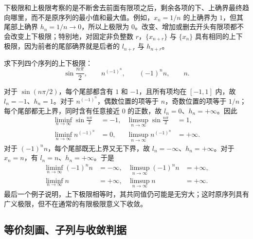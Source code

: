 \begin{notealert}[title={上下极限描述尾部的边界}]
下极限和上极限考察的是不断舍去前面有限项之后，剩余各项的下、上确界最终趋向哪里，而不是原序列的最小值和最大值。例如，$x_n=1/n$ 的上确界为 $1$，但其尾部上确界 $h_n=1/n\to0$，所以上极限为 $0$。改变、增加或删去开头有限项都不会改变上下极限；特别地，对固定非负整数 $r$，$\{x_{n+r}\}$ 与 $\{x_n\}$ 具有相同的上下极限，因为前者的尾部确界就是后者的 $l_{n+r}$ 与 $h_{n+r}$。
\end{notealert}

\begin{example}
求下列四个序列的上下极限：
\[
    \sin\frac{n\pi}{2},\qquad n^{(-1)^n},\qquad (-1)^n n,\qquad n.
\]
\end{example}

\begin{solve}
对于 $\sin(n\pi/2)$，每个尾部都含有 $1$ 和 $-1$，且所有项均在 $[-1,1]$ 内，故 $l_n=-1$、$h_n=1$。对于 $n^{(-1)^n}$，偶数位置的项等于 $n$，奇数位置的项等于 $1/n$；每个尾部都无上界，同时含有任意接近 $0$ 的正数，故 $l_n=0$、$h_n=+\infty$。因此
\[
    \begin{aligned}
        \liminf_{n\to\infty}\sin\frac{n\pi}{2}&=-1,
        &\limsup_{n\to\infty}\sin\frac{n\pi}{2}&=1,\\
        \liminf_{n\to\infty}n^{(-1)^n}&=0,
        &\limsup_{n\to\infty}n^{(-1)^n}&=+\infty.
    \end{aligned}
\]
对于 $(-1)^n n$，每个尾部既无上界又无下界，故 $l_n=-\infty$、$h_n=+\infty$。对于 $x_n=n$，有 $l_n=n$、$h_n=+\infty$。于是
\[
    \begin{aligned}
        \liminf_{n\to\infty}(-1)^n n&=-\infty,
        &\limsup_{n\to\infty}(-1)^n n&=+\infty,\\
        \liminf_{n\to\infty}n&=+\infty,
        &\limsup_{n\to\infty}n&=+\infty.
    \end{aligned}
\]
最后一个例子说明，上下极限相等时，其共同值仍可能是无穷大；这时原序列具有广义极限，但不在通常的有限极限意义下收敛。
\end{solve}

\subsection{等价刻画、子列与收敛判据}
\label{subsec:liminf-limsup-characterizations}

